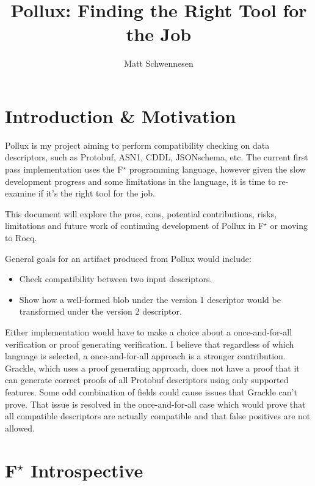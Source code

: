 \documentclass[11pt]{article}
\author{Matt Schwennesen}
\title{Pollux: Finding the Right Tool for the Job}
\date{}
\newcommand{\fstar}{F$^\star$}
\begin{document}
\maketitle
\tableofcontents

\section{Introduction \& Motivation}

Pollux is my project aiming to perform compatibility checking on data
descriptors, such as Protobuf, ASN1, CDDL, JSONschema, etc. The current first
pass implementation uses the \fstar{} programming language, however given the
slow development progress and some limitations in the language, it is time to
re-examine if it's the right tool for the job.

This document will explore the pros, cons, potential contributions, risks,
limitations and future work of continuing development of Pollux in \fstar{} or
moving to Rocq.

General goals for an artifact produced from Pollux would include:
\begin{itemize}
\item Check compatibility between two input descriptors. 
\item Show how a well-formed blob under the version 1 descriptor would be
  transformed under the version 2 descriptor.
\end{itemize}

Either implementation would have to make a choice about a once-and-for-all
verification or proof generating verification. I believe that regardless of
which language is selected, a once-and-for-all approach is a stronger
contribution. Grackle, which uses a proof generating approach, does not have a
proof that it can generate correct proofs of all Protobuf descriptors using only
supported features. Some odd combination of fields could cause issues that
Grackle can't prove. That issue is resolved in the once-and-for-all case which
would prove that all compatible descriptors are actually compatible and that
false positives are not allowed.

\section{\fstar{} Introspective}
\end{document}
